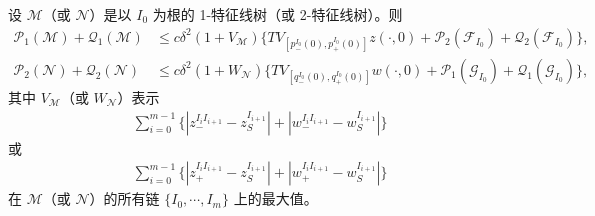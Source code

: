 \documentclass[../../main.tex]{subfiles}
\begin{document}
\begin{lemma}\label{lemma:ch12-树界}
设 $\mathscr{M}$（或 $\mathscr{N}$）是以 $I_0$ 为根的 1-特征线树（或 2-特征线树）。则
\begin{align}
\mathscr{P}_1(\mathscr{M})+\mathscr{Q}_1(\mathscr{M})&\leqslant c\delta^2(1+V_{\mathscr{M}})\{TV_{[p_-^{I_0}(0),p_+^{I_0}(0)]}z(\cdot,0)+\mathscr{P}_2(\mathscr{F}_{I_0})+\mathscr{Q}_2(\mathscr{F}_{I_0})\},
\label{align:ch12-树界1}\\
\mathscr{P}_2(\mathscr{N})+\mathscr{Q}_2(\mathscr{N})&\leqslant c\delta^2(1+W_{\mathscr{N}})\{TV_{[q_-^{I_0}(0),q_+^{I_0}(0)]}w(\cdot,0)+\mathscr{P}_1(\mathscr{G}_{I_0})+\mathscr{Q}_1(\mathscr{G}_{I_0})\},
\label{align:ch12-树界2}
\end{align}
其中 $V_{\mathscr{M}}$（或 $W_{\mathscr{N}}$）表示
\begin{align}
\sum_{i=0}^{m-1}\{|z_-^{I_iI_{i+1}}-z_S^{I_{i+1}}|+|w_-^{I_iI_{i+1}}-w_S^{I_{i+1}}|\}
\label{align:ch12-V定义}
\end{align}
或
\begin{align}
\sum_{i=0}^{m-1}\{|z_+^{I_iI_{i+1}}-z_S^{I_{i+1}}|+|w_+^{I_iI_{i+1}}-w_S^{I_{i+1}}|\}
\label{align:ch12-W定义}
\end{align}
在 $\mathscr{M}$（或 $\mathscr{N}$）的所有链 $\{I_0,\cdots,I_m\}$ 上的最大值。
\end{lemma}
\end{document}
